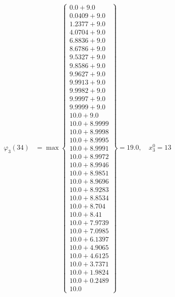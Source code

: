 \documentclass{article}
\begin{document}
\begin{align*}
  
\varphi_{3}(34) &= \max \left\{ \begin{array}{c}
0.0 + 9.0 \\
 0.0409 + 9.0 \\
 1.2377 + 9.0 \\
 4.0704 + 9.0 \\
 6.8836 + 9.0 \\
 8.6786 + 9.0 \\
 9.5327 + 9.0 \\
 9.8586 + 9.0 \\
 9.9627 + 9.0 \\
 9.9913 + 9.0 \\
 9.9982 + 9.0 \\
 9.9997 + 9.0 \\
 9.9999 + 9.0 \\
 10.0 + 9.0 \\
 10.0 + 8.9999 \\
 10.0 + 8.9998 \\
 10.0 + 8.9995 \\
 10.0 + 8.9991 \\
 10.0 + 8.9972 \\
 10.0 + 8.9946 \\
 10.0 + 8.9851 \\
 10.0 + 8.9696 \\
 10.0 + 8.9283 \\
 10.0 + 8.8534 \\
 10.0 + 8.704 \\
 10.0 + 8.41 \\
 10.0 + 7.9739 \\
 10.0 + 7.0985 \\
 10.0 + 6.1397 \\
 10.0 + 4.9065 \\
 10.0 + 4.6125 \\
 10.0 + 3.7371 \\
 10.0 + 1.9824 \\
 10.0 + 0.2489 \\
 10.0
\end{array} \right\}=19.0,\quad x_{3}^0=13\\
  
  
  

\end{align*}
\end{document}

